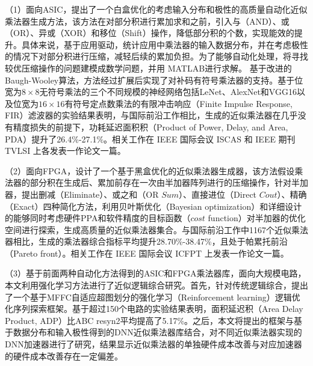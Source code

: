 （1）面向ASIC，提出了一个白盒优化的考虑输入分布和极性的高质量自动化近似乘法器生成方法，该方法在对部分积进行累加求和之前，引入与（AND）、或（OR）、异或（XOR）和移位（Shift）操作，降低部分积的个数，实现能效的提升。具体来说，基于应用驱动，统计应用中乘法器的输入数据分布，并在考虑极性的情况下对部分积进行压缩，减轻后续的累加负担。为了能够自动化处理，将寻找较优压缩操作的问题建模成数学问题，并用 MATLAB进行求解。
基于改进的Baugh-Wooley算法\cite{EM:baugh-wooley,EM:baugh-wooley_modified_PP_reorga,EM:baugh-wooley_diff}，方法经过扩展后实现了对补码有符号乘法器的支持。基于位宽为$8\times8$无符号乘法的三个不同规模的神经网络包括LeNet、AlexNet和VGG16以及位宽为$16\times16$有符号定点数乘法的有限冲击响应（Finite Impulse Response, FIR）滤波器的实验结果表明，与国际前沿工作相比，生成的近似乘法器在几乎没有精度损失的前提下，功耗延迟面积积（Product of Power, Delay, and Area, PDA）提升了26.4\%-27.1\%。相关工作在 IEEE 国际会议 ISCAS 和 IEEE 期刊 TVLSI 上各发表一作论文一篇。

（2）面向FPGA，设计了一个基于黑盒优化的近似乘法器生成器，该方法假设乘法器的部分积在生成后、累加前存在一次由半加器阵列进行的压缩操作，针对半加器，提出删减（Eliminate）、或之和（OR $Sum$）、直接进位（Direct $Cout$）、精确（Exact）四种简化方法，利用贝叶斯优化（Bayesian optimization）和详细设计的能够同时考虑硬件PPA和软件精度的目标函数（$cost$ function）对半加器的优化空间进行探索，生成高质量的近似乘法器集合。与国际前沿工作中1167个近似乘法器相比，生成的乘法器综合指标平均提升28.70\%-38.47\%，且处于帕累托前沿（Pareto front）。相关工作在 IEEE 国际会议 ICFPT 上发表一作论文一篇。

（3）基于前面两种自动化方法得到的ASIC和FPGA乘法器库，面向大规模电路，本文利用强化学习方法进行了近似逻辑综合研究。首先，针对传统逻辑综合，提出了一个基于MFFC自适应超图划分的强化学习（Reinforcement learning）逻辑优化序列探索框架。基于超过150个电路的实验结果表明，面积延迟积（Area Delay Product, ADP）比ABC\cite{LS:ABC} resyn2平均提高了5.17\%。之后，本文将提出的框架与基于数据分布和输入极性得到的DNN近似乘法器库结合，对不同近似乘法器实现的DNN加速器进行了研究，结果显示近似乘法器的单独硬件成本改善与对应加速器的硬件成本改善存在一定偏差。

